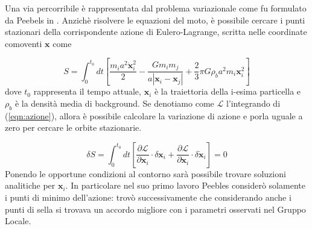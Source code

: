 Una via percorribile è rappresentata dal problema variazionale come fu formulato da Peebels in \cite{peebles}.
Anzichè risolvere le equazioni del moto, è possibile cercare i punti stazionari della corrispondente
azione di Eulero-Lagrange, scritta nelle coordinate comoventi $\bm{x}$ come

\begin{equation}
    \label{eqn:azione}
    S = \int_0^{t_0} dt \left[\frac{m_i a^2 \dot{\bm{x}}_i^2}{2} - \frac{Gm_i m_j}{a|\bm{x}_i-\bm{x}_j|}+\frac{2}{3}\pi G\rho_ba^2 m_i \bm{x}_i^2\right]
\end{equation}
dove $t_0$ rappresenta il tempo attuale, $\bm{x}_i$ è la traiettoria della i-esima particella e $\rho_b$
è la densità media di background. Se denotiamo come $\mathcal{L}$ l'integrando di (\ref{eqn:azione}), allora
è possibile calcolare la variazione di azione e porla uguale a zero per cercare le orbite stazionarie.

\begin{equation}
    \delta S = \int_0^{t_0} dt \left[\frac{\partial \mathcal{L}}{\partial \bm{x}_i}\cdot \delta\bm{x}_i + \frac{\partial\mathcal{L}}{\partial \bm{x}_i}\cdot \delta \dot{\bm{x}}_i\right] = 0 
\end{equation}
Ponendo le opportune condizioni al contorno sarà possibile trovare soluzioni analitiche per $\bm{x}_i$.
In particolare nel suo primo lavoro Peebles considerò solamente i punti di minimo dell'azione: trovò
successivamente che considerando anche i punti di sella si trovava un accordo migliore con i parametri
osservati nel Gruppo Locale.

